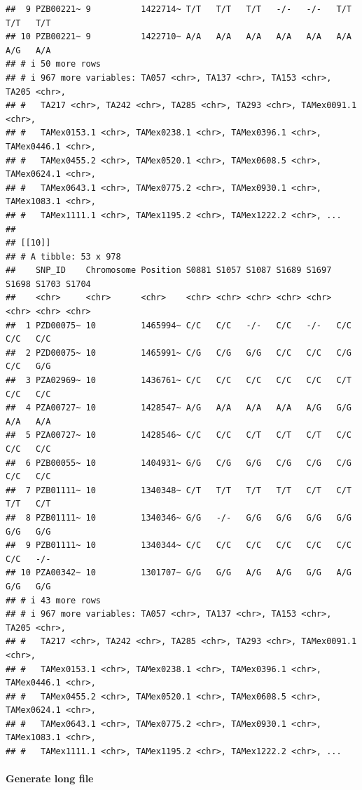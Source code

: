 \documentclass[
]{article}
\begin{document}
\begin{verbatim}
##  9 PZB00221~ 9          1422714~ T/T   T/T   T/T   -/-   -/-   T/T   T/T   T/T  
## 10 PZB00221~ 9          1422710~ A/A   A/A   A/A   A/A   A/A   A/A   A/G   A/A  
## # i 50 more rows
## # i 967 more variables: TA057 <chr>, TA137 <chr>, TA153 <chr>, TA205 <chr>,
## #   TA217 <chr>, TA242 <chr>, TA285 <chr>, TA293 <chr>, TAMex0091.1 <chr>,
## #   TAMex0153.1 <chr>, TAMex0238.1 <chr>, TAMex0396.1 <chr>, TAMex0446.1 <chr>,
## #   TAMex0455.2 <chr>, TAMex0520.1 <chr>, TAMex0608.5 <chr>, TAMex0624.1 <chr>,
## #   TAMex0643.1 <chr>, TAMex0775.2 <chr>, TAMex0930.1 <chr>, TAMex1083.1 <chr>,
## #   TAMex1111.1 <chr>, TAMex1195.2 <chr>, TAMex1222.2 <chr>, ...
## 
## [[10]]
## # A tibble: 53 x 978
##    SNP_ID    Chromosome Position S0881 S1057 S1087 S1689 S1697 S1698 S1703 S1704
##    <chr>     <chr>      <chr>    <chr> <chr> <chr> <chr> <chr> <chr> <chr> <chr>
##  1 PZD00075~ 10         1465994~ C/C   C/C   -/-   C/C   -/-   C/C   C/C   C/C  
##  2 PZD00075~ 10         1465991~ C/G   C/G   G/G   C/C   C/C   C/G   C/C   G/G  
##  3 PZA02969~ 10         1436761~ C/C   C/C   C/C   C/C   C/C   C/T   C/C   C/C  
##  4 PZA00727~ 10         1428547~ A/G   A/A   A/A   A/A   A/G   G/G   A/A   A/A  
##  5 PZA00727~ 10         1428546~ C/C   C/C   C/T   C/T   C/T   C/C   C/C   C/C  
##  6 PZB00055~ 10         1404931~ G/G   C/G   G/G   C/G   C/G   C/G   C/C   C/C  
##  7 PZB01111~ 10         1340348~ C/T   T/T   T/T   T/T   C/T   C/T   T/T   C/T  
##  8 PZB01111~ 10         1340346~ G/G   -/-   G/G   G/G   G/G   G/G   G/G   G/G  
##  9 PZB01111~ 10         1340344~ C/C   C/C   C/C   C/C   C/C   C/C   C/C   -/-  
## 10 PZA00342~ 10         1301707~ G/G   G/G   A/G   A/G   G/G   A/G   G/G   G/G  
## # i 43 more rows
## # i 967 more variables: TA057 <chr>, TA137 <chr>, TA153 <chr>, TA205 <chr>,
## #   TA217 <chr>, TA242 <chr>, TA285 <chr>, TA293 <chr>, TAMex0091.1 <chr>,
## #   TAMex0153.1 <chr>, TAMex0238.1 <chr>, TAMex0396.1 <chr>, TAMex0446.1 <chr>,
## #   TAMex0455.2 <chr>, TAMex0520.1 <chr>, TAMex0608.5 <chr>, TAMex0624.1 <chr>,
## #   TAMex0643.1 <chr>, TAMex0775.2 <chr>, TAMex0930.1 <chr>, TAMex1083.1 <chr>,
## #   TAMex1111.1 <chr>, TAMex1195.2 <chr>, TAMex1222.2 <chr>, ...
\end{verbatim}

\paragraph{Generate long file}\label{generate-long-file}
\end{document}

